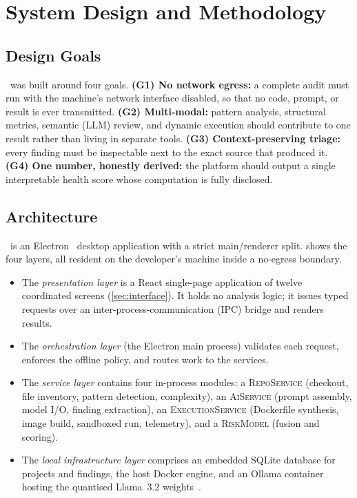 \section{System Design and Methodology}
\label{sec:method}

\subsection{Design Goals}
\cs\ was built around four goals. \textbf{(G1) No network egress:} a
complete audit must run with the machine's network interface disabled, so
that no code, prompt, or result is ever transmitted. \textbf{(G2)
Multi-modal:} pattern analysis, structural metrics, semantic (LLM)
review, and dynamic execution should contribute to one result rather than
living in separate tools. \textbf{(G3) Context-preserving triage:} every
finding must be inspectable next to the exact source that produced it.
\textbf{(G4) One number, honestly derived:} the platform should output a
single interpretable health score whose computation is fully disclosed.

\subsection{Architecture}
\label{sec:arch}


\cs\ is an Electron~\cite{electron} desktop application with a strict
main/renderer split.  shows the four layers, all
resident on the developer's machine inside a no-egress boundary.

\begin{itemize}
 \item The \emph{presentation layer} is a React single-page application
 of twelve coordinated screens (\cref{sec:interface}). It holds no
 analysis logic; it issues typed requests over an
 inter-process-communication (IPC) bridge and renders results.
 \item The \emph{orchestration layer} (the Electron main process)
 validates each request, enforces the offline policy, and routes
 work to the services.
 \item The \emph{service layer} contains four in-process modules: a
 \textsc{RepoService} (checkout, file inventory, pattern
 detection, complexity), an \textsc{AiService} (prompt assembly,
 model I/O, finding extraction), an \textsc{ExecutionService}
 (Dockerfile synthesis, image build, sandboxed run, telemetry),
 and a \textsc{RiskModel} (fusion and scoring).
 \item The \emph{local infrastructure layer} comprises an embedded
 SQLite database for projects and findings, the host Docker
 engine, and an Ollama container hosting the quantised
 \mbox{Llama~3.2} weights~\cite{ollama,touvron2023llama2}.
\end{itemize}

